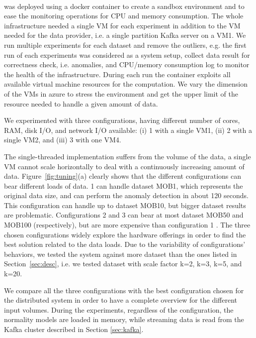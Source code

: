 {\paragraph{\sti{}}
\sti{} was deployed using a docker container to create a sandbox environment and to ease the monitoring operations for CPU and memory consumption. The whole infrastructure needed a single VM for each experiment in addition to the VM needed for the data provider,  i.e. a single partition Kafka server on a VM1.
We run multiple experiments for each dataset and remove the outliers, e.g. the first run of each experiments was considered as a system setup, collect data result for correctness check, i.e. anomalies, and CPU/memory consumption log to monitor the health of the infrastructure. During each run the container exploits all available virtual machine resources for the computation. We vary the dimension of the VMs in azure to stress the environment and get the upper limit of the resource needed to handle a given amount of data.

We experimented with three configurations, having different number of cores, RAM, disk I/O, and network I/O available: (i) \sti{}1 with a single VM1, (ii) \sti{}2 with a single VM2, and (iii) \sti{}3 with one VM4.

The single-threaded implementation suffers from the volume of the data, a single VM cannot scale horizontally to deal with a continuously increasing amount of data. 
Figure~\ref{fig:tuning}(a) clearly shows that the different configurations can bear different loads of data.
\sti{}1 can handle dataset MOB1, which represents the original data size, and can perform the anomaly detection in about 120 seconds. This configuration can handle up to dataset MOB10, but bigger dataset results are problematic. Configurations \sti{}2 and \sti{}3 can bear at most dataset MOB50 and MOB100  (respectively), but are more expensive than configuration \sti{}1 .
The three chosen configurations widely explore the hardware offerings in order to find the best solution related to the data loads. Due to the variability of configurations' behaviors, we tested the system against more dataset than the ones listed in Section~\ref{sec:desc}, i.e. we tested dataset with scale factor k=2, k=3, k=5, and k=20.

We compare all the three \sti{} configurations with the best configuration chosen for the distributed system in order to have a complete overview for the different input volumes. During the experiments, regardless of the \sti{} configuration, the normality models are loaded in memory, while streaming data is read from the Kafka cluster described in Section \ref{sec:kafka}.

}
